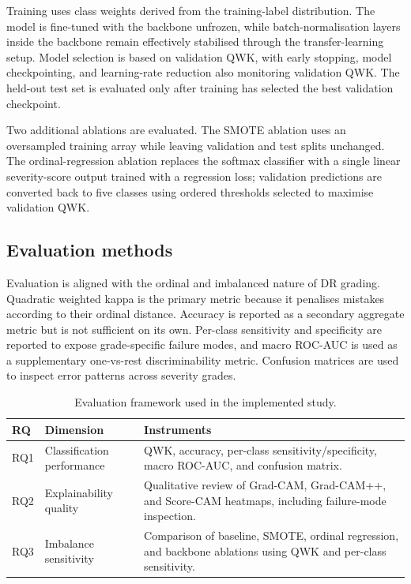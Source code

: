 \documentclass[11pt,a4paper]{article}
\begin{document}
Training uses class weights derived from the training-label distribution. The model is fine-tuned with the backbone unfrozen, while batch-normalisation layers inside the backbone remain effectively stabilised through the transfer-learning setup. Model selection is based on validation QWK, with early stopping, model checkpointing, and learning-rate reduction also monitoring validation QWK. The held-out test set is evaluated only after training has selected the best validation checkpoint.

Two additional ablations are evaluated. The SMOTE ablation uses an oversampled training array while leaving validation and test splits unchanged. The ordinal-regression ablation replaces the softmax classifier with a single linear severity-score output trained with a regression loss; validation predictions are converted back to five classes using ordered thresholds selected to maximise validation QWK.

\subsection{Evaluation methods}
Evaluation is aligned with the ordinal and imbalanced nature of DR grading. Quadratic weighted kappa is the primary metric because it penalises mistakes according to their ordinal distance. Accuracy is reported as a secondary aggregate metric but is not sufficient on its own. Per-class sensitivity and specificity are reported to expose grade-specific failure modes, and macro ROC-AUC is used as a supplementary one-vs-rest discriminability metric. Confusion matrices are used to inspect error patterns across severity grades.

\begin{table}[t]
  \centering
  \caption{Evaluation framework used in the implemented study.}
  \label{tab:evaluation-framework}
  \begin{tabularx}{\textwidth}{p{1.2cm}p{3.2cm}X}
    \toprule
    RQ & Dimension & Instruments \\
    \midrule
    RQ1 & Classification performance & QWK, accuracy, per-class sensitivity/specificity, macro ROC-AUC, and confusion matrix. \\
    RQ2 & Explainability quality & Qualitative review of Grad-CAM, Grad-CAM++, and Score-CAM heatmaps, including failure-mode inspection. \\
    RQ3 & Imbalance sensitivity & Comparison of baseline, SMOTE, ordinal regression, and backbone ablations using QWK and per-class sensitivity. \\
    \bottomrule
  \end{tabularx}
\end{table}
\end{document}
